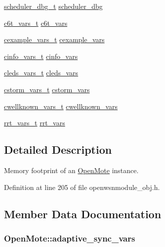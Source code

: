 \begin{DoxyCompactItemize}
\item 
\hyperlink{structscheduler__dbg__t}{scheduler\+\_\+dbg\+\_\+t} \hyperlink{struct_open_mote_a64bbadb0cb6de192bf1aece2a5d42580}{scheduler\+\_\+dbg}
\item 
\hyperlink{structc6t__vars__t}{c6t\+\_\+vars\+\_\+t} \hyperlink{struct_open_mote_aafb440c974a45fce8dce5a1bcfbe8360}{c6t\+\_\+vars}
\item 
\hyperlink{structcexample__vars__t}{cexample\+\_\+vars\+\_\+t} \hyperlink{struct_open_mote_a2601bf500d6585a238281c665c0eecee}{cexample\+\_\+vars}
\item 
\hyperlink{structcinfo__vars__t}{cinfo\+\_\+vars\+\_\+t} \hyperlink{struct_open_mote_a8a59e70923fa709385930eab33599db4}{cinfo\+\_\+vars}
\item 
\hyperlink{structcleds__vars__t}{cleds\+\_\+vars\+\_\+t} \hyperlink{struct_open_mote_af6231c89f1008084144bf1fe1706a016}{cleds\+\_\+vars}
\item 
\hyperlink{structcstorm__vars__t}{cstorm\+\_\+vars\+\_\+t} \hyperlink{struct_open_mote_a13239242a3bd108d2c5f5152f7cf5a66}{cstorm\+\_\+vars}
\item 
\hyperlink{structcwellknown__vars__t}{cwellknown\+\_\+vars\+\_\+t} \hyperlink{struct_open_mote_a0b1c0999849a0f4f6667f7b736e4d2fa}{cwellknown\+\_\+vars}
\item 
\hyperlink{structrrt__vars__t}{rrt\+\_\+vars\+\_\+t} \hyperlink{struct_open_mote_ab3971cd4d94d74662025d9551d008cbc}{rrt\+\_\+vars}
\end{DoxyCompactItemize}


\subsection{Detailed Description}
Memory footprint of an \hyperlink{struct_open_mote}{Open\+Mote} instance. 

Definition at line 205 of file openwsnmodule\+\_\+obj.\+h.



\subsection{Member Data Documentation}
\subsubsection[{\texorpdfstring{adaptive\+\_\+sync\+\_\+vars}{adaptive_sync_vars}}]{ Open\+Mote\+::adaptive\+\_\+sync\+\_\+vars}\hypertarget{struct_open_mote_a46fd6d534d0e28197bdbd47463598890}{}\label{struct_open_mote_a46fd6d534d0e28197bdbd47463598890}


